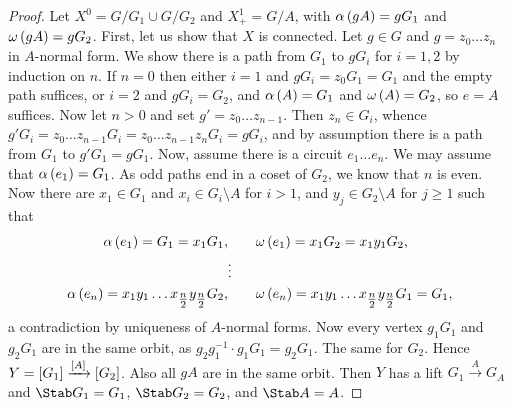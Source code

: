 \begin{proof}
Let $ X^0 = G / G_1 \cup G / G_2 $ and $ X_+^1 = G / A $, with $ \alpha\br{gA} = gG_1 $ and $ \omega\br{gA} = gG_2 $. First, let us show that $ X $ is connected. Let $ g \in G $ and $ g = z_0 \dots z_n $ in $ A $-normal form. We show there is a path from $ G_1 $ to $ gG_i $ for $ i = 1, 2 $ by induction on $ n $. If $ n = 0 $ then either $ i = 1 $ and $ gG_i = z_0G_1 = G_1 $ and the empty path suffices, or $ i = 2 $ and $ gG_i = G_2 $, and $ \alpha\br{A} = G_1 $ and $ \omega\br{A} = G_2 $, so $ e = A $ suffices. Now let $ n > 0 $ and set $ g' = z_0 \dots z_{n - 1} $. Then $ z_n \in G_i $, whence $ g'G_i = z_0 \dots z_{n - 1}G_i = z_0 \dots z_{n - 1}z_nG_i = gG_i $, and by assumption there is a path from $ G_1 $ to $ g'G_1 = gG_1 $. Now, assume there is a circuit $ e_1 \dots e_n $. We may assume that $ \alpha\br{e_1} = G_1 $. As odd paths end in a coset of $ G_2 $, we know that $ n $ is even. Now there are $ x_1 \in G_1 $ and $ x_i \in G_i \setminus A $ for $ i > 1 $, and $ y_j \in G_2 \setminus A $ for $ j \ge 1 $ such that
\begin{align*}
\alpha\br{e_1} = G_1 = x_1G_1, & \qquad \omega\br{e_1} = x_1G_2 = x_1y_1G_2, \\
& \vdots \\
\alpha\br{e_n} = x_1y_1 \dots x_{\tfrac{n}{2}}y_{\tfrac{n}{2}}G_2, & \qquad \omega\br{e_n} = x_1y_1 \dots x_{\tfrac{n}{2}}y_{\tfrac{n}{2}}G_1 = G_1,
\end{align*}
a contradiction by uniqueness of $ A $-normal forms. Now every vertex $ g_1G_1 $ and $ g_2G_1 $ are in the same orbit, as $ g_2g_1^{-1} \cdot g_1G_1 = g_2G_1 $. The same for $ G_2 $. Hence $ Y = \sbr{G_1} \xrightarrow{\sbr{A}} \sbr{G_2} $. Also all $ gA $ are in the same orbit. Then $ Y $ has a lift $ G_1 \xrightarrow{A} G_A $ and $ \Stab G_1 = G_1 $, $ \Stab G_2 = G_2 $, and $ \Stab A = A $.
\end{proof}

